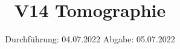 

\subject{Fortgeschrittenenpraktikum}
\title{V14 Tomographie}
\date{%
  Durchführung: 04.07.2022
  \hspace{3em}
  Abgabe: 05.07.2022
}



\maketitle
\thispagestyle{empty}
\tableofcontents
\newpage








\printbibliography{}




